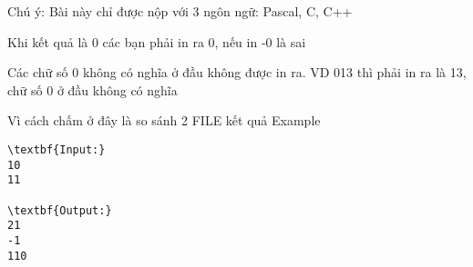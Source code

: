 Chú ý:
Bài này chỉ được nộp với 3 ngôn ngữ: Pascal, C, C++  

   Khi kết quả là 0 các bạn phải in ra 0, nếu in -0 là sai  

   Các chữ số 0 không có nghĩa ở đầu không được in ra. VD 013 thì phải in ra là 13, chữ số 0 ở đầu không có nghĩa  

   Vì cách chấm ở đây là so sánh 2 FILE kết quả
Example
\begin{verbatim}
\textbf{Input:}
10
11

\textbf{Output:}
21
-1
110
\end{verbatim}